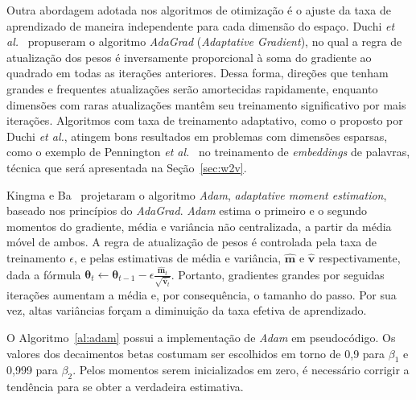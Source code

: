 Outra abordagem adotada nos algoritmos de otimização é o ajuste da taxa de aprendizado de maneira independente para
cada dimensão do espaço.
Duchi \textit{et al.}~\cite{duchi11} propuseram o algoritmo \textit{AdaGrad} (\textit{Adaptative Gradient}), no qual a
regra de atualização dos pesos é inversamente proporcional à soma do gradiente ao quadrado em todas as iterações
anteriores.
Dessa forma, direções que tenham grandes e frequentes atualizações serão amortecidas rapidamente, enquanto dimensões com
raras atualizações mantêm seu treinamento significativo por mais iterações.
Algoritmos com taxa de treinamento adaptativo, como o proposto por Duchi \textit{et al.}, atingem bons resultados em
problemas com dimensões esparsas, como o exemplo de Pennington \textit{et al.}~\cite{pennington14} no treinamento de
\textit{embeddings} de palavras, técnica que será apresentada na Seção~\ref{sec:w2v}.

Kingma e Ba~\cite{kingma14} projetaram o algoritmo \textit{Adam}, \textit{adaptative moment estimation}, baseado nos
princípios do \textit{AdaGrad}.
\textit{Adam} estima o primeiro e o segundo momentos do gradiente, média e variância não centralizada, a partir da média
móvel de ambos.
A regra de atualização de pesos é controlada pela taxa de treinamento $\epsilon$, e pelas estimativas de média e
variância, $\mathbf{\hat{m}}$ e $\mathbf{\hat{v}}$ respectivamente, dada a fórmula
$\boldsymbol{\theta}_{t} \gets \boldsymbol{\theta}_{t-1} - \epsilon \frac{\mathbf{\hat{m}}_{t}}{\sqrt{\mathbf{\hat{v}}_{t}}}$.
Portanto, gradientes grandes por seguidas iterações aumentam a média e, por consequência, o tamanho do passo.
Por sua vez, altas variâncias forçam a diminuição da taxa efetiva de aprendizado.

O Algoritmo~\ref{al:adam} possui a implementação de \textit{Adam} em pseudocódigo.
Os valores dos decaimentos betas costumam ser escolhidos em torno de 0,9 para $\beta_{1}$ e 0,999 para $\beta_{2}$.
Pelos momentos serem inicializados em zero, é necessário corrigir a tendência para se obter a verdadeira estimativa.

